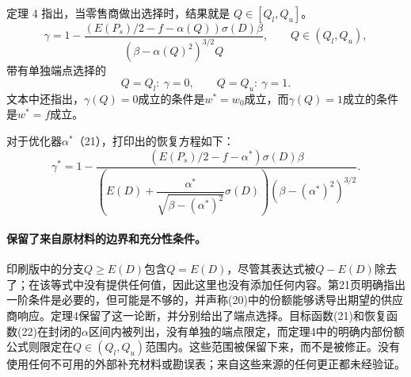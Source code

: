 \documentclass{article}
\begin{document}
定理 4 指出，当零售商做出选择时，结果就是 $Q\in[Q_l,Q_u]$。
\[
\gamma=1-
\frac{(E(P_s)/2-f-\alpha(Q))\sigma(D)\beta}
{(\beta-\alpha(Q)^2)^{3/2}Q},\qquad Q\in(Q_l,Q_u),
\]
带有单独端点选择的
\[
Q=Q_l:\ \gamma=0,\qquad Q=Q_u:\ \gamma=1.
\]
文本中还指出，$\gamma(Q)=0$成立的条件是$w^*=w_0$成立，而$\gamma(Q)=1$成立的条件是$w^*=f$成立。

对于优化器$\alpha^*$（21），打印出的恢复方程如下：
\begin{equation}
\gamma^*=1-
\frac{(E(P_s)/2-f-\alpha^*)\sigma(D)\beta}
{\left(E(D)+\dfrac{\alpha^*}{\sqrt{\beta-(\alpha^*)^2}}\sigma(D)\right)
(\beta-(\alpha^*)^2)^{3/2}}.
\tag{22}
\end{equation}

\paragraph{保留了来自原材料的边界和充分性条件。}
印刷版中的分支$Q\geq E(D)$包含$Q=E(D)$，尽管其表达式被$Q-E(D)$除去了；在该等式中没有提供任何值，因此这里也没有添加任何内容。第21页明确指出一阶条件是必要的，但可能是不够的，并声称(20)中的份额能够诱导出期望的供应商响应。定理4保留了这一论断，并分别给出了端点选择。目标函数(21)和恢复函数(22)在封闭的$\alpha$区间内被列出，没有单独的端点限定，而定理4中的明确内部份额公式则限定在$Q\in(Q_l,Q_u)$范围内。这些范围被保留下来，而不是被修正。没有使用任何不可用的外部补充材料或勘误表；来自这些来源的任何更正都未经验证。
\end{document}
